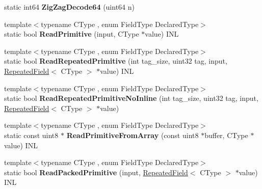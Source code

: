 \begin{DoxyCompactItemize}
static int64 {\bfseries Zig\+Zag\+Decode64} (uint64 n)
\item 
\mbox{\label{classgoogle_1_1protobuf_1_1internal_1_1WireFormatLite_a105ff35eb5c13e8b45c2b59f61b6ec4a}} 
{\footnotesize template$<$typename C\+Type , enum Field\+Type Declared\+Type$>$ }\\static bool {\bfseries Read\+Primitive} (input, C\+Type $\ast$value) I\+NL
\item 
\mbox{\label{classgoogle_1_1protobuf_1_1internal_1_1WireFormatLite_a1020f83d6b33ce3079df9c3ba7bb3472}} 
{\footnotesize template$<$typename C\+Type , enum Field\+Type Declared\+Type$>$ }\\static bool {\bfseries Read\+Repeated\+Primitive} (int tag\+\_\+size, uint32 tag, input, \hyperlink{classgoogle_1_1protobuf_1_1RepeatedField}{Repeated\+Field}$<$ C\+Type $>$ $\ast$value) I\+NL
\item 
\mbox{\label{classgoogle_1_1protobuf_1_1internal_1_1WireFormatLite_a816aa343268b474630cd0a16a64eec6a}} 
{\footnotesize template$<$typename C\+Type , enum Field\+Type Declared\+Type$>$ }\\static bool {\bfseries Read\+Repeated\+Primitive\+No\+Inline} (int tag\+\_\+size, uint32 tag, input, \hyperlink{classgoogle_1_1protobuf_1_1RepeatedField}{Repeated\+Field}$<$ C\+Type $>$ $\ast$value)
\item 
\mbox{\label{classgoogle_1_1protobuf_1_1internal_1_1WireFormatLite_a425362d04a2fb7307c9f606c4f27615e}} 
{\footnotesize template$<$typename C\+Type , enum Field\+Type Declared\+Type$>$ }\\static const uint8 $\ast$ {\bfseries Read\+Primitive\+From\+Array} (const uint8 $\ast$buffer, C\+Type $\ast$value) I\+NL
\item 
\mbox{\label{classgoogle_1_1protobuf_1_1internal_1_1WireFormatLite_a067946322d27a8adf7514adc4bb4f5a2}} 
{\footnotesize template$<$typename C\+Type , enum Field\+Type Declared\+Type$>$ }\\static bool {\bfseries Read\+Packed\+Primitive} (input, \hyperlink{classgoogle_1_1protobuf_1_1RepeatedField}{Repeated\+Field}$<$ C\+Type $>$ $\ast$value) I\+NL

\end{DoxyCompactItemize}
